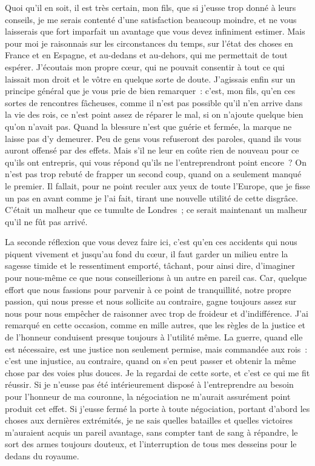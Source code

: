 \documentclass[french,twoside]{book} %
\begin{document}
Quoi qu’il en soit, il est très certain, mon fils, que si j’eusse trop donné à leurs conseils, je me serais contenté d’une satisfaction beaucoup moindre, et ne vous laisserais que fort imparfait un avantage que vous devez infiniment estimer. Mais pour moi je raisonnais sur les circonstances du temps, sur l’état des choses en France et en Espagne, et au-dedans et au-dehors, qui me permettait de tout espérer. J’écoutais mon propre cœur, qui ne pouvait consentir à tout ce qui laissait mon droit et le vôtre en quelque sorte de doute. J’agissais enfin sur un principe général que je vous prie de bien remarquer : c’est, mon fils, qu’en ces sortes de rencontres fâcheuses, comme il n’est pas possible qu’il n’en arrive dans la vie des rois, ce n’est point assez de réparer le mal, si on n’ajoute quelque bien qu’on n’avait pas. Quand la blessure n’est que guérie et fermée, la marque ne laisse pas d’y demeurer. Peu de gens vous refuseront des paroles, quand ils vous auront offensé par des effets. Mais s’il ne leur en coûte rien de nouveau pour ce qu’ils ont entrepris, qui vous répond qu’ils ne l’entreprendront point encore ? On n’est pas trop rebuté de frapper un second coup, quand on a seulement manqué le premier. Il fallait, pour ne point reculer aux yeux de toute l’Europe, que je fisse un pas en avant comme je l’ai fait, tirant une nouvelle utilité de cette disgrâce. C’était un malheur que ce tumulte de Londres ; ce serait maintenant un malheur qu’il ne fût pas arrivé.\par
La seconde réflexion que vous devez faire ici, c’est qu’en ces accidents qui nous piquent vivement et jusqu’au fond du cœur, il faut garder un milieu entre la sagesse timide et le ressentiment emporté, tâchant, pour ainsi dire, d’imaginer pour nous-même ce que nous conseillerions à un autre en pareil cas. Car, quelque effort que nous fassions pour parvenir à ce point de tranquillité, notre propre passion, qui nous presse et nous sollicite au contraire, gagne toujours assez sur nous pour nous empêcher de raisonner avec trop de froideur et d’indifférence. J’ai remarqué en cette occasion, comme en mille autres, que les règles de la justice et de l’honneur conduisent presque toujours à l’utilité même. La guerre, quand elle est nécessaire, est une justice non seulement permise, mais commandée aux rois : c’est une injustice, au contraire, quand on s’en peut passer et obtenir la même chose par des voies plus douces. Je la regardai de cette sorte, et c’est ce qui me fit réussir. Si je n’eusse pas été intérieurement disposé à l’entreprendre au besoin pour l’honneur de ma couronne, la négociation ne m’aurait assurément point produit cet effet. Si j’eusse fermé la porte à toute négociation, portant d’abord les choses aux dernières extrémités, je ne sais quelles batailles et quelles victoires m’auraient acquis un pareil avantage, sans compter tant de sang à répandre, le sort des armes toujours douteux, et l’interruption de tous mes desseins pour le dedans du royaume.\par
\end{document}
